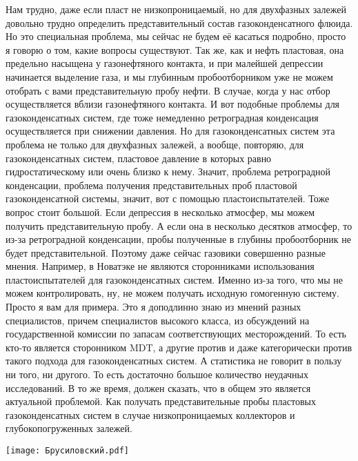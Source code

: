 \documentclass[main.tex]{subfiles}
\begin{document}
Нам трудно, даже если пласт не низкопроницаемый, но для двухфазных залежей довольно трудно определить представительный состав газоконденсатного флюида.
Но это специальная проблема, мы сейчас не будем её касаться подробно, просто я говорю о том, какие вопросы существуют.
Так же, как и нефть пластовая, она предельно насыщена у газонефтяного контакта, и при малейшей депрессии начинается выделение газа, и мы глубинным пробоотборником уже не можем отобрать с вами представительную пробу нефти.
В случае, когда у нас отбор осуществляется вблизи газонефтяного контакта.
И вот подобные проблемы для газоконденсатных систем, где тоже немедленно ретроградная конденсация осуществляется при снижении давления.
Но для газоконденсатных систем эта проблема не только для двухфазных залежей, а вообще, повторяю, для газоконденсатных систем, пластовое давление в которых равно гидростатическому или очень близко к нему.
Значит, проблема ретроградной конденсации, проблема получения представительных проб пластовой газоконденсатной системы, значит, вот с помощью пластоиспытателей.
Тоже вопрос стоит большой.
Если депрессия в несколько атмосфер, мы можем получить представительную пробу.
А если она в несколько десятков атмосфер, то из-за ретроградной конденсации, пробы полученные в глубины пробоотборник не будет представительной.
Поэтому даже сейчас газовики совершенно разные мнения.
Например, в Новатэке не являются сторонниками использования пластоиспытателей для газоконденсатных систем.
Именно из-за того, что мы не можем контролировать, ну, не можем получать исходную гомогенную систему.
Просто я вам для примера.
Это я доподлинно знаю из мнений разных специалистов, причем специалистов высокого класса, из обсуждений на государственной комиссии по запасам соответствующих месторождений.
То есть кто-то является сторонником MDT, а другие против и даже категорически против такого подхода для газоконденсатных систем.
А статистика не говорит в пользу ни того, ни другого. То есть достаточно большое количество неудачных исследований.
В то же время, должен сказать, что в общем это является актуальной проблемой.
Как получать представительные пробы пластовых газоконденсатных систем в случае низкопроницаемых коллекторов и глубокопогруженных залежей.

\begin{center}
\texttt{[image: Брусиловский.pdf]}
\end{center}
\end{document}
